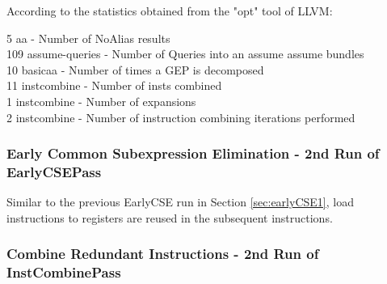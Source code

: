 



According to the statistics obtained from the "opt" tool of LLVM:
\begin{displayquote}
  5 aa             - Number of NoAlias results \\
109 assume-queries - Number of Queries into an assume assume bundles \\
 10 basicaa        - Number of times a GEP is decomposed \\
 11 instcombine    - Number of insts combined \\
  1 instcombine    - Number of expansions \\
  2 instcombine    - Number of instruction combining iterations performed \\
\end{displayquote}

\subsubsection{Early Common Subexpression Elimination - 2nd Run of EarlyCSEPass}
Similar to the previous EarlyCSE run in Section \ref{sec:earlyCSE1}, load instructions to registers are reused in the subsequent instructions.





\subsubsection{Combine Redundant Instructions - 2nd Run of InstCombinePass}

